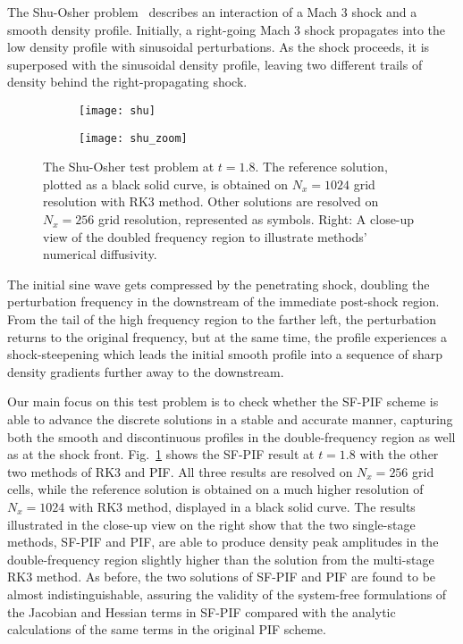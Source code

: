 \documentclass[times,preprint,3p]{elsarticle}
\begin{document}
The Shu-Osher problem~\cite{shu1989efficient} describes an interaction of a Mach 3 shock
and a smooth density profile. Initially, a right-going Mach 3 shock propagates into the low
density profile with sinusoidal perturbations. As the shock proceeds, it is superposed with the
sinusoidal density profile, leaving two different trails of density behind the right-propagating shock.
%
\begin{figure}[ht!]
    \centering
    \begin{subfigure}{80mm}
        \centering
        \texttt{[image: shu]}
    \end{subfigure}
    \begin{subfigure}{80mm}
        \centering
        \texttt{[image: shu\_zoom]}
    \end{subfigure}
    \caption{The Shu-Osher test problem at \( t = 1.8 \).
        The reference solution, plotted as a black solid curve,
        is obtained on \( N_{x} = 1024 \) grid resolution
        with RK3 method.
        Other solutions are resolved on \( N_{x} = 256 \) grid resolution,
        represented as symbols.
        Right: A close-up view of the doubled frequency region to illustrate methods' numerical diffusivity.
    }\label{fig:1d-shu}
\end{figure}
%
The initial sine wave gets compressed by the penetrating shock, doubling the perturbation frequency
in the downstream of the immediate post-shock region.
From the tail of the high frequency region to the farther left,
the perturbation returns to the original frequency, but at the same time,
the profile experiences
a shock-steepening which leads the initial smooth profile
into a sequence of sharp density gradients further away to the downstream.
%

Our main focus on this test problem is to check whether the SF-PIF scheme
is able to advance the discrete solutions in a stable and accurate manner,
capturing both the smooth and discontinuous profiles
in the double-frequency region as well as at the shock front.
%
Fig.~\ref{fig:1d-shu} shows the SF-PIF result at \( t = 1.8 \) with the other two methods of
RK3 and PIF\@. All three results are resolved on \( N_{x} = 256 \) grid cells,
while the reference solution is obtained on a much higher resolution of \( N_{x} = 1024 \)
with RK3 method, displayed in a black solid curve.
%
The results illustrated in the close-up view on the right show that the two single-stage methods,
SF-PIF and PIF, are able to produce density peak amplitudes in the
double-frequency region slightly higher than the solution from the
multi-stage RK3 method. As before, the two solutions of SF-PIF and PIF are
found to be almost indistinguishable, assuring the validity of the system-free
formulations of the Jacobian and Hessian terms in SF-PIF
compared with the analytic calculations of the same terms in the original PIF scheme.
%
%
\end{document}
